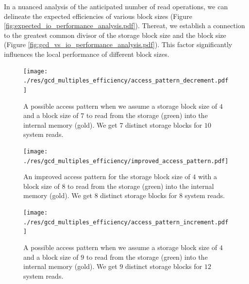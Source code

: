 \documentclass[twocolumn]{article}
\begin{document}
In a nuanced analysis of the anticipated number of read operations, we can delineate the expected efficiencies of various block sizes (Figure \ref{fig:expected_io_performance_analysis.pdf}).
Thereat, we establish a connection to the greatest common divisor of the storage block size and the block size (Figure \ref{fig:gcd_vs_io_performance_analysis.pdf}).
This factor significantly influences the local performance of different block sizes.

\begin{figure}[htb]
    \begin{minipage}{0.475 \textwidth}
        \centering
        \texttt{[image: ./res/gcd\_multiples\_efficiency/access\_pattern\_decrement.pdf]}
        \caption{A possible access pattern when we assume a storage block size of \( 4 \) and a block size of \( 7 \) to read from the storage (green) into the internal memory (gold).
            We get \( 7 \) distinct storage blocks for \( 10 \) system reads. }
        \label{fig:access_pattern_decrement.pdf}
    \end{minipage}
\end{figure}

\begin{figure}[htb]
    \begin{minipage}{0.475 \textwidth}
        \centering
        \texttt{[image: ./res/gcd\_multiples\_efficiency/improved\_access\_pattern.pdf]}
        \caption{An improved access pattern for the storage block size of \( 4 \) with a block size of \( 8 \) to read from the storage (green) into the internal memory (gold).
            We get \( 8 \) distinct storage blocks for \( 8 \) system reads. }
        \label{fig:improved_access_pattern.pdf}
    \end{minipage}
\end{figure}

\begin{figure}[htb]
    \begin{minipage}{0.475 \textwidth}
        \centering
        \texttt{[image: ./res/gcd\_multiples\_efficiency/access\_pattern\_increment.pdf]}
        \caption{A possible access pattern when we assume a storage block size of \( 4 \) and a block size of \( 9 \) to read from the storage (green) into the internal memory (gold).
            We get \( 9 \) distinct storage blocks for \( 12 \) system reads. }
        \label{fig:access_pattern_increment.pdf}
    \end{minipage}
\end{figure}
\end{document}
